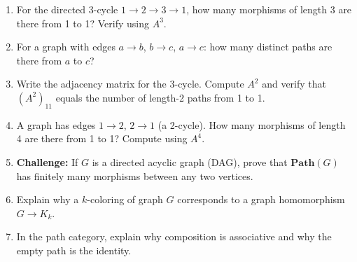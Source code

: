 \begin{goingdeeper}
\begin{enumerate}
  \item For the directed 3-cycle $1 \to 2 \to 3 \to 1$, how many morphisms of length 3 are there from 1 to 1? Verify using $A^3$.

  \item For a graph with edges $a \to b$, $b \to c$, $a \to c$: how many distinct paths are there from $a$ to $c$?

  \item Write the adjacency matrix for the 3-cycle. Compute $A^2$ and verify that $(A^2)_{11}$ equals the number of length-2 paths from 1 to 1.

  \item A graph has edges $1 \to 2$, $2 \to 1$ (a 2-cycle). How many morphisms of length 4 are there from 1 to 1? Compute using $A^4$.

  \item \textbf{Challenge:} If $G$ is a directed acyclic graph (DAG), prove that $\mathbf{Path}(G)$ has finitely many morphisms between any two vertices.

  \item Explain why a $k$-coloring of graph $G$ corresponds to a graph homomorphism $G \to K_k$.

  \item In the path category, explain why composition is associative and why the empty path is the identity.
\end{enumerate}
\end{goingdeeper}

